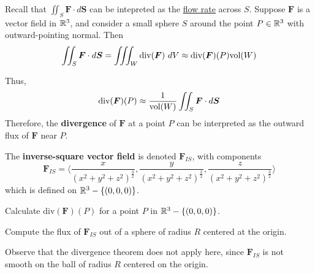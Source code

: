 \begin{corollary}
    Recall that $\iint_S \bm{F} \cdot d\bm{S}$ can be intepreted as the \underline{flow rate} across $S$.  Suppose $\bm{F}$ is a vector field in $\mathbb{R}^3$, and consider a small sphere $S$ around the point $P \in \mathbb{R}^3$ with outward-pointing normal. Then
    $$\iint_S \bm{F} \cdot d\bm{S} = \iiint_W \text{div}(\bm{F}) \ dV \approx \text{div}(\bm{F})(P) \textnormal{vol}(W)$$
    
    Thus, $$\text{div}(\bm{F})(P) \approx \frac{1}{\textnormal{vol}(W)}\iint_S \bm{F} \cdot d\bm{S}$$
    Therefore, the \textbf{divergence} of $\bm{F}$ at a point $P$ can be interpreted as the outward flux of $\bm{F}$ near $P$.
    \end{corollary}

     \begin{definition}
    The \textbf{inverse-square vector field} is denoted $\bm{F}_{IS}$, with components
    $$\bm{F}_{IS} = \langle \frac{x}{(x^2+y^2+z^2)^\frac{3}{2}},\frac{y}{(x^2+y^2+z^2)^\frac{3}{2}},\frac{z}{(x^2+y^2+z^2)^\frac{3}{2}}\rangle$$
    which is defined on $\mathbb{R}^3 - \{(0,0,0)\}$.
    \end{definition}
    
    \begin{center}
    \end{center}

\begin{example}
     Calculate $\text{div}(\bm{F})(P)$ for a point $P$ in $\mathbb{R}^3 - \{(0,0,0)\}$.
\end{example}

\begin{example}
     Compute the flux of $\bm{F}_{IS}$ out of a sphere of radius $R$ centered at the origin.

\begin{remark}
    Observe that the divergence theorem does not apply here, since $\bm{F}_{IS}$ is not smooth on the ball of radius $R$ centered on the origin.
    \end{remark}
     
\end{example}

